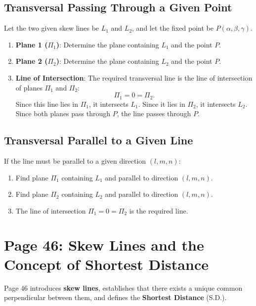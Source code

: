 \subsection{Transversal Passing Through a Given Point}
Let the two given skew lines be $L_1$ and $L_2$, and let the fixed point be $P(\alpha, \beta, \gamma)$.
\begin{enumerate}
    \item \textbf{Plane 1 ($\Pi_1$)}: Determine the plane containing $L_1$ and the point $P$.
    \item \textbf{Plane 2 ($\Pi_2$)}: Determine the plane containing $L_2$ and the point $P$.
    \item \textbf{Line of Intersection}: The required transversal line is the line of intersection of planes $\Pi_1$ and $\Pi_2$:
    \begin{equation}
        \Pi_1 = 0 = \Pi_2.
    \end{equation}
    Since this line lies in $\Pi_1$, it intersects $L_1$. Since it lies in $\Pi_2$, it intersects $L_2$. Since both planes pass through $P$, the line passes through $P$.
\end{enumerate}

\subsection{Transversal Parallel to a Given Line}
If the line must be parallel to a given direction $(l, m, n)$:
\begin{enumerate}
    \item Find plane $\Pi_1$ containing $L_1$ and parallel to direction $(l, m, n)$.
    \item Find plane $\Pi_2$ containing $L_2$ and parallel to direction $(l, m, n)$.
    \item The line of intersection $\Pi_1 = 0 = \Pi_2$ is the required line.
\end{enumerate}

\section{Page 46: Skew Lines and the Concept of Shortest Distance}
\label{sec:page46}

\begin{conceptbox}
Page 46 introduces \textbf{skew lines}, establishes that there exists a unique common perpendicular between them, and defines the \textbf{Shortest Distance} (S.D.).
\end{conceptbox}

